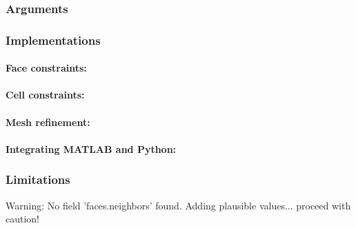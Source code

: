 \subsubsection{Arguments}

\subsubsection{Implementations}
\paragraph{Face constraints:}
\paragraph{Cell constraints:}
\paragraph{Mesh refinement:}
\paragraph{Integrating MATLAB and Python:}

\subsubsection{Limitations}

\begin{codeError}
Warning: No field 'faces.neighbors' found. Adding plausible values... proceed with caution! 
\end{codeError}
